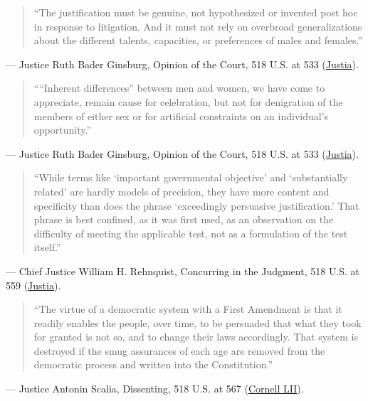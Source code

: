 \documentclass[12pt]{article}
\begin{document}
\begin{quote}
``The justification must be genuine, not hypothesized or invented post hoc in response to litigation. And it must not rely on overbroad generalizations about the different talents, capacities, or preferences of males and females.''
\end{quote}
\noindent --- Justice Ruth Bader Ginsburg, Opinion of the Court, 518 U.S. at 533 (\href{https://supreme.justia.com/cases/federal/us/518/515/}{Justia}).

\begin{quote}
````Inherent differences'' between men and women, we have come to appreciate, remain cause for celebration, but not for denigration of the members of either sex or for artificial constraints on an individual's opportunity.''
\end{quote}
\noindent --- Justice Ruth Bader Ginsburg, Opinion of the Court, 518 U.S. at 533 (\href{https://supreme.justia.com/cases/federal/us/518/515/}{Justia}).

\begin{quote}
``While terms like `important governmental objective' and `substantially related' are hardly models of precision, they have more content and specificity than does the phrase `exceedingly persuasive justification.' That phrase is best confined, as it was first used, as an observation on the difficulty of meeting the applicable test, not as a formulation of the test itself.''
\end{quote}
\noindent --- Chief Justice William H. Rehnquist, Concurring in the Judgment, 518 U.S. at 559 (\href{https://supreme.justia.com/cases/federal/us/518/515/}{Justia}).

\begin{quote}
``The virtue of a democratic system with a First Amendment is that it readily enables the people, over time, to be persuaded that what they took for granted is not so, and to change their laws accordingly. That system is destroyed if the smug assurances of each age are removed from the democratic process and written into the Constitution.''
\end{quote}
\noindent --- Justice Antonin Scalia, Dissenting, 518 U.S. at 567 (\href{https://www.law.cornell.edu/supct/html/94-1941.ZD.html}{Cornell LII}).
\end{document}
